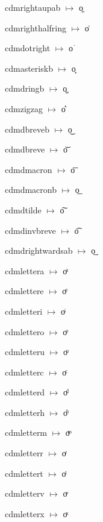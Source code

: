 {\noindent cdmrightaupab $\mapsto$ {\cdmformat o͖}\par
\noindent cdmrighthalfring $\mapsto$ {\cdmformat o͗}\par
\noindent cdmdotright $\mapsto$ {\cdmformat o͘}\par
\noindent cdmasteriskb $\mapsto$ {\cdmformat o͙}\par
\noindent cdmdringb $\mapsto$ {\cdmformat o͚}\par
\noindent cdmzigzag $\mapsto$ {\cdmformat o͛}\par
\noindent cdmdbreveb $\mapsto$ {\cdmformat o͜}\par
\noindent cdmdbreve $\mapsto$ {\cdmformat o͝}\par
\noindent cdmdmacron $\mapsto$ {\cdmformat o͞}\par
\noindent cdmdmacronb $\mapsto$ {\cdmformat o͟}\par
\noindent cdmdtilde $\mapsto$ {\cdmformat o͠}\par
\noindent cdmdinvbreve $\mapsto$ {\cdmformat o͡}\par
\noindent cdmdrightwardsab $\mapsto$ {\cdmformat o͢}\par
\noindent cdmlettera $\mapsto$ {\cdmformat oͣ}\par
\noindent cdmlettere $\mapsto$ {\cdmformat oͤ}\par
\noindent cdmletteri $\mapsto$ {\cdmformat oͥ}\par
\noindent cdmlettero $\mapsto$ {\cdmformat oͦ}\par
\noindent cdmletteru $\mapsto$ {\cdmformat oͧ}\par
\noindent cdmletterc $\mapsto$ {\cdmformat oͨ}\par
\noindent cdmletterd $\mapsto$ {\cdmformat oͩ}\par
\noindent cdmletterh $\mapsto$ {\cdmformat oͪ}\par
\noindent cdmletterm $\mapsto$ {\cdmformat oͫ}\par
\noindent cdmletterr $\mapsto$ {\cdmformat oͬ}\par
\noindent cdmlettert $\mapsto$ {\cdmformat oͭ}\par
\noindent cdmletterv $\mapsto$ {\cdmformat oͮ}\par
\noindent cdmletterx $\mapsto$ {\cdmformat oͯ}\par
}
